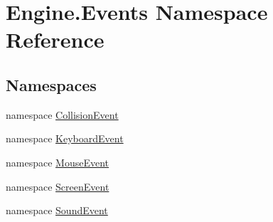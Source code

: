 \hypertarget{a00246}{}\section{Engine.\+Events Namespace Reference}
\label{a00246}
\subsection*{Namespaces}
\begin{DoxyCompactItemize}
\item 
namespace \hyperlink{a00245}{Collision\+Event}
\item 
namespace \hyperlink{a00247}{Keyboard\+Event}
\item 
namespace \hyperlink{a00248}{Mouse\+Event}
\item 
namespace \hyperlink{a00249}{Screen\+Event}
\item 
namespace \hyperlink{a00250}{Sound\+Event}
\end{DoxyCompactItemize}
